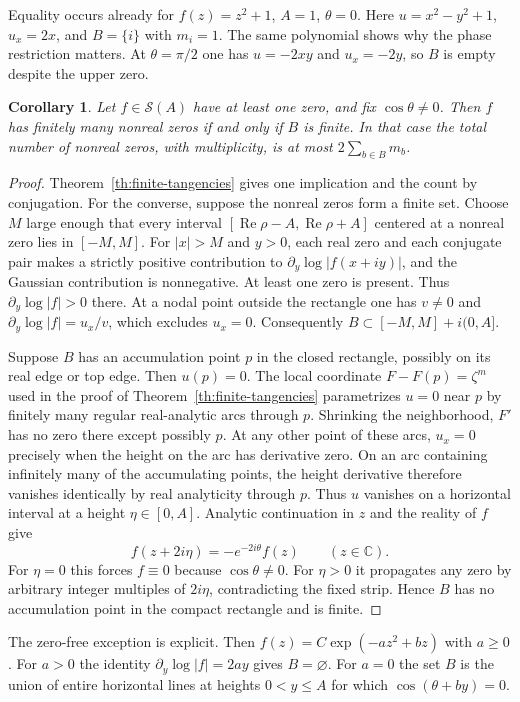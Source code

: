 \documentclass[11pt,a4paper]{article}
\newtheorem{corollary}[theorem]{Corollary}
\numberwithin{equation}{section}
\renewcommand{\Re}{\operatorname{Re}}\renewcommand{\Im}{\operatorname{Im}}
\begin{document}
Equality occurs already for $f(z)=z^2+1$, $A=1$, $\theta=0$. Here
$u=x^2-y^2+1$, $u_x=2x$, and $B=\{i\}$ with $m_i=1$. The same
polynomial shows why the phase restriction matters. At $\theta=\pi/2$
one has $u=-2xy$ and $u_x=-2y$, so $B$ is empty despite the upper zero.
\begin{corollary}\label{cor:finite-iff}
Let $f\in\mathcal S(A)$ have at least one zero, and fix
$\cos\theta\ne0$. Then $f$ has finitely many nonreal zeros if and
only if $B$ is finite. In that case the total number of nonreal zeros,
with multiplicity, is at most $2\sum_{b\in B}m_b$.
\end{corollary}
\begin{proof}
Theorem~\ref{th:finite-tangencies} gives one implication and the count
by conjugation. For the converse, suppose the nonreal zeros form a
finite set. Choose $M$ large enough that every interval
$[\Re\rho-A,\Re\rho+A]$ centered at a nonreal zero lies in $[-M,M]$.
For $|x|>M$ and $y>0$, each real zero and each conjugate pair makes a
strictly positive contribution to $\partial_y\log|f(x+iy)|$, and the
Gaussian contribution is nonnegative. At least one zero is present.
Thus $\partial_y\log|f|>0$ there. At a nodal point outside the
rectangle one has $v\ne0$ and $\partial_y\log|f|=u_x/v$, which excludes
$u_x=0$. Consequently $B\subset[-M,M]+i(0,A]$.

Suppose $B$ has an accumulation point $p$ in the closed rectangle,
possibly on its real edge or top edge. Then $u(p)=0$. The local
coordinate $F-F(p)=\zeta^m$ used in the proof of
Theorem~\ref{th:finite-tangencies} parametrizes $u=0$ near $p$ by
finitely many regular real-analytic arcs through $p$. Shrinking the
neighborhood, $F'$ has no zero there except possibly $p$. At any
other point of these arcs, $u_x=0$ precisely when the height on the
arc has derivative zero. On an arc containing infinitely many of
the accumulating points, the height derivative therefore vanishes
identically by real analyticity through $p$. Thus $u$ vanishes on a
horizontal interval at a height $\eta\in[0,A]$. Analytic continuation
in $z$ and the reality of $f$ give
\[
 f(z+2i\eta)=-e^{-2i\theta}f(z)\qquad(z\in\mathbb C).
\]
For $\eta=0$ this forces $f\equiv0$ because $\cos\theta\ne0$.
For $\eta>0$ it propagates any zero by arbitrary integer multiples
of $2i\eta$, contradicting the fixed strip. Hence $B$ has no
accumulation point in the compact rectangle and is finite.
\end{proof}

The zero-free exception is explicit. Then
$f(z)=C\exp(-az^2+bz)$ with $a\ge0$. For $a>0$ the identity
$\partial_y\log|f|=2ay$ gives $B=\varnothing$. For $a=0$ the set $B$
is the union of entire horizontal lines at heights $0<y\le A$ for
which $\cos(\theta+by)=0$.
\end{document}
